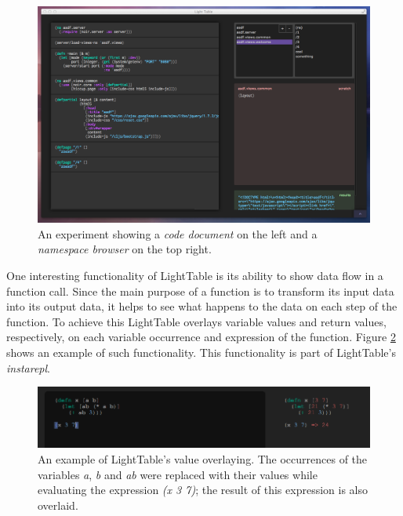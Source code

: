 \documentclass{./llncs2e/llncs}
\begin{document}
	\begin{figure}
	  \centering
	  \includegraphics[width=1.0\textwidth]{img/lt_clojure_table}
	    \caption{An experiment showing a \emph{code document} on the left and a \emph{namespace browser} on the top right.}
	  \label{fig:lt:clojure:table}
	\end{figure} 

	One interesting functionality of LightTable is its ability to show data flow in a function call. 
	Since the main purpose of a function is to transform its input data into its output data, it helps to see what happens to the data on each step of the function. 
	To achieve this LightTable overlays variable values and return values, respectively, on each variable occurrence and expression of the function. 
	Figure \ref{fig:lt:val:overlay} shows an example of such functionality. 
	This functionality is part of LightTable's \emph{instarepl}.

	\begin{figure}
		\centering
		\includegraphics[width=1.0\textwidth]{img/lt_val_overlay}
			\caption{An example of LightTable's value overlaying. The occurrences of the variables \emph{a}, \emph{b} and \emph{ab} were replaced with their values while evaluating the expression \emph{(x 3 7)}; the result of this expression is also overlaid.}
		\label{fig:lt:val:overlay}
	\end{figure}
\end{document}
